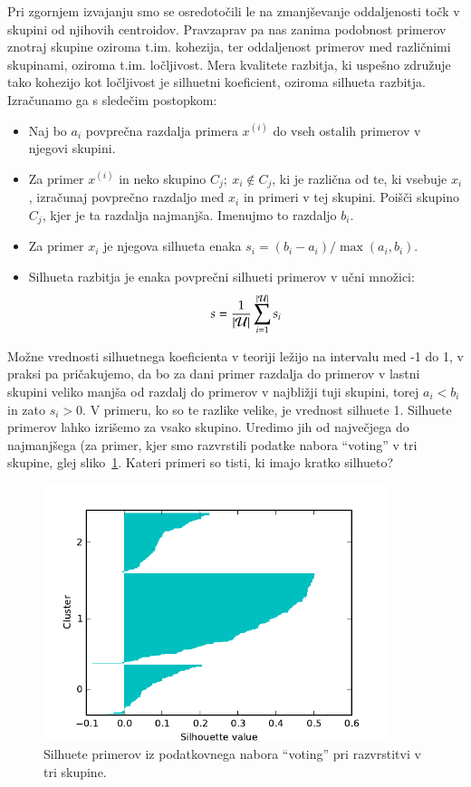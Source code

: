 Pri zgornjem izvajanju smo se osredotočili le na zmanjševanje
oddaljenosti točk v skupini od njihovih centroidov. Pravzaprav pa nas
zanima podobnost primerov znotraj skupine oziroma t.im. kohezija, ter
oddaljenost primerov med različnimi skupinami, oziroma
t.im. ločljivost. Mera kvalitete razbitja, ki uspešno združuje tako
kohezijo kot ločljivost je silhuetni koeficient, oziroma silhueta
razbitja. Izračunamo ga s sledečim postopkom:
\begin{itemize}
\item Naj bo $a_i$ povprečna razdalja primera $x^{(i)}$ do vseh ostalih primerov v njegovi skupini.
\item Za primer $x^{(i)}$ in neko skupino $C_j;\ x_i\not\in C_j$, ki   je različna od te, ki vsebuje $x_i$, izračunaj povprečno razdaljo   med $x_i$ in primeri v tej skupini. Poišči skupino $C_j$, kjer je ta   razdalja najmanjša. Imenujmo to razdaljo $b_i$.
\item Za primer $x_i$ je njegova silhueta enaka
  $s_i=(b_i-a_i)/\max(a_i,b_i)$.
\item Silhueta razbitja je enaka povprečni silhueti primerov v učni
  množici:
$$s={1 \over |\mathcal{U}|}\sum_{i=1}^{|\mathcal{U}|} s_i$$
\end{itemize}

Možne vrednosti silhuetnega koeficienta v teoriji ležijo na intervalu
med -1 do 1, v praksi pa pričakujemo, da bo za dani primer razdalja do
primerov v lastni skupini veliko manjša od razdalj do primerov v
najbližji tuji skupini, torej $a_i<b_i$ in zato $s_i>0$. V primeru, ko
so te razlike velike, je vrednost silhuete 1. Silhuete primerov lahko
izrišemo za vsako skupino. Uredimo jih od največjega do najmanjšega
(za primer, kjer smo razvrstili podatke nabora ``voting'' v tri
skupine, glej sliko~\ref{f-kmeans-silhouette-voting}. Kateri primeri so tisti, ki imajo kratko silhueto?

\begin{figure}[htbp]
\begin{center}
\includegraphics[width=10cm]{slike/kmeans-silhouette-voting.pdf}
\caption{Silhuete primerov iz podatkovnega nabora ``voting'' pri
  razvrstitvi v tri skupine.}
\label{f-kmeans-silhouette-voting}
\end{center}
\end{figure}

